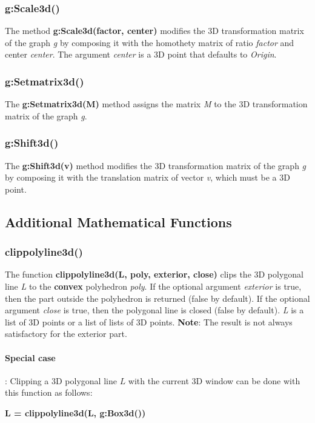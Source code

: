 \subsubsection{g:Scale3d()}
The method \textbf{g:Scale3d(factor, center)} modifies the 3D transformation matrix of the graph \emph g by composing it with the homothety matrix of ratio \emph{factor} and center \emph{center}. The argument \emph{center} is a 3D point that defaults to \emph{Origin}.

\subsubsection{g:Setmatrix3d()}
The \textbf{g:Setmatrix3d(M)} method assigns the matrix \emph M to the 3D transformation matrix of the graph \emph g.

\subsubsection{g:Shift3d()}
The \textbf{g:Shift3d(v)} method modifies the 3D transformation matrix of the graph \emph g by composing it with the translation matrix of vector \emph{v}, which must be a 3D point.


\subsection{Additional Mathematical Functions}

\subsubsection{clippolyline3d()}
The function \textbf{clippolyline3d(L, poly, exterior, close)} clips the 3D polygonal line \emph{L} to the \textbf{convex} polyhedron \emph{poly}. If the optional argument \emph{exterior} is true, then the part outside the polyhedron is returned (false by default). If the optional argument \emph{close} is true, then the polygonal line is closed (false by default). \emph{L} is a list of 3D points or a list of lists of 3D points.
\textbf{Note}: The result is not always satisfactory for the exterior part.

\paragraph{Special case}: Clipping a 3D polygonal line $L$ with the current 3D window can be done with this function as follows:

\begin{center}
\textbf{L = clippolyline3d(L, g:Box3d())}
\end{center}

